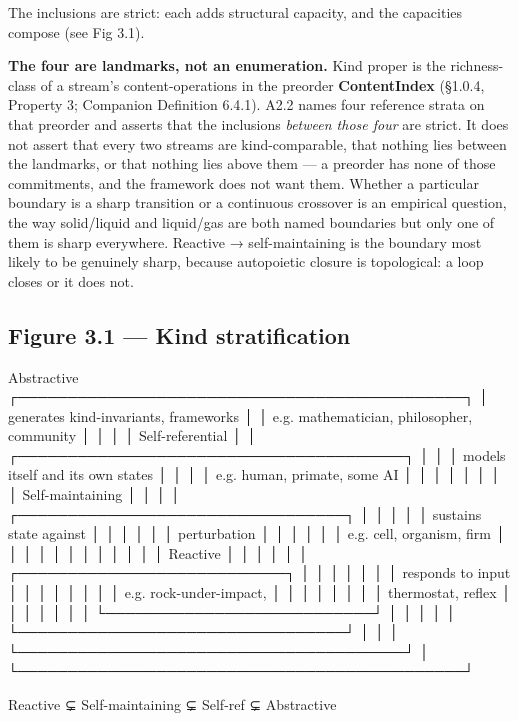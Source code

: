 \documentclass[11pt, openany]{book}
\begin{document}
The inclusions are strict: each adds structural capacity, and the capacities compose (see Fig 3.1).

\textbf{The four are landmarks, not an enumeration.} Kind proper is the richness-class of a stream's content-operations in the preorder \textbf{ContentIndex} (§1.0.4, Property 3; Companion Definition 6.4.1). A2.2 names four reference strata on that preorder and asserts that the inclusions \textit{between those four} are strict. It does not assert that every two streams are kind-comparable, that nothing lies between the landmarks, or that nothing lies above them --- a preorder has none of those commitments, and the framework does not want them. Whether a particular boundary is a sharp transition or a continuous crossover is an empirical question, the way solid/liquid and liquid/gas are both named boundaries but only one of them is sharp everywhere. Reactive → self-maintaining is the boundary most likely to be genuinely sharp, because autopoietic closure is topological: a loop closes or it does not.

\subsection{Figure 3.1 --- Kind stratification}

\begin{Code}
  Abstractive
  ┌─────────────────────────────────────────────┐
  │  generates kind-invariants, frameworks      │
  │  e.g. mathematician, philosopher, community │
  │                                             │
  │  Self-referential                           │
  │  ┌───────────────────────────────────────┐  │
  │  │  models itself and its own states     │  │
  │  │  e.g. human, primate, some AI         │  │
  │  │                                       │  │
  │  │  Self-maintaining                     │  │
  │  │  ┌─────────────────────────────────┐  │  │
  │  │  │  sustains state against         │  │  │
  │  │  │  perturbation                   │  │  │
  │  │  │  e.g. cell, organism, firm      │  │  │
  │  │  │                                 │  │  │
  │  │  │  Reactive                       │  │  │
  │  │  │  ┌───────────────────────────┐  │  │  │
  │  │  │  │  responds to input        │  │  │  │
  │  │  │  │  e.g. rock-under-impact,  │  │  │  │
  │  │  │  │       thermostat, reflex  │  │  │  │
  │  │  │  └───────────────────────────┘  │  │  │
  │  │  └─────────────────────────────────┘  │  │
  │  └───────────────────────────────────────┘  │
  └─────────────────────────────────────────────┘

  Reactive ⊊ Self-maintaining ⊊ Self-ref ⊊ Abstractive
\end{Code}
\end{document}
